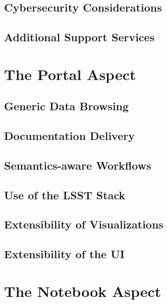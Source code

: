 \documentclass[DM,lsstdraft,toc]{lsstdoc}
\begin{document}
\subsection{Cybersecurity Considerations}\label{cybersecurity-considerations}

\subsection{Additional Support Services}\label{additional-support-services}

\section{The Portal Aspect}\label{portal-aspect}

\subsection{Generic Data Browsing}\label{generic-data-browsing}

\subsection{Documentation Delivery}\label{documentation-delivery}

\subsection{Semantics-aware Workflows}\label{semantics-aware-workflows}

\subsection{Use of the LSST Stack}\label{use-of-the-lsst-stack}

\subsection{Extensibility of Visualizations}\label{extensibility-of-visualizations}

\subsection{Extensibility of the UI}\label{extensibility-of-the-ui}

\section{The Notebook Aspect}\label{notebook-aspect}
\end{document}
